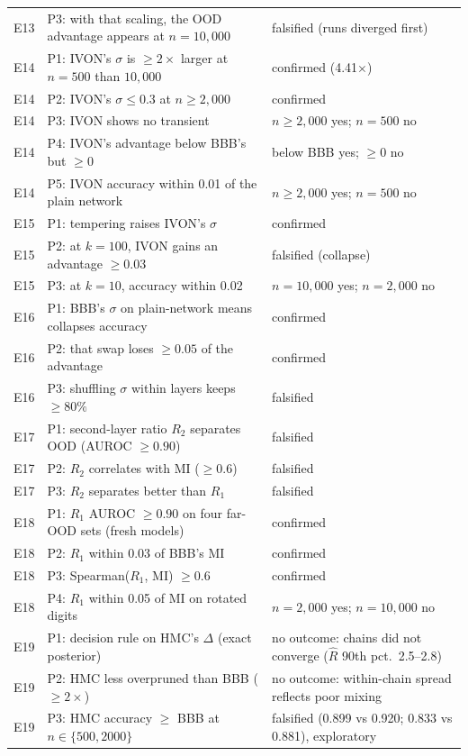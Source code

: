 \documentclass[10pt]{article}
\begin{document}
{\begin{longtable}{p{0.9cm}p{8.6cm}p{4.6cm}}
E13 & P3: with that scaling, the OOD advantage appears at $n=10{,}000$ & falsified (runs diverged first) \\
E14 & P1: IVON's $\sigma$ is $\ge2\times$ larger at $n=500$ than $10{,}000$ & confirmed (4.41$\times$) \\
E14 & P2: IVON's $\sigma\le0.3$ at $n\ge2{,}000$ & confirmed \\
E14 & P3: IVON shows no transient & $n\ge2{,}000$ yes; $n=500$ no \\
E14 & P4: IVON's advantage below BBB's but $\ge0$ & below BBB yes; $\ge0$ no \\
E14 & P5: IVON accuracy within 0.01 of the plain network & $n\ge2{,}000$ yes; $n=500$ no \\
E15 & P1: tempering raises IVON's $\sigma$ & confirmed \\
E15 & P2: at $k=100$, IVON gains an advantage $\ge0.03$ & falsified (collapse) \\
E15 & P3: at $k=10$, accuracy within 0.02 & $n=10{,}000$ yes; $n=2{,}000$ no \\
E16 & P1: BBB's $\sigma$ on plain-network means collapses accuracy & confirmed \\
E16 & P2: that swap loses $\ge0.05$ of the advantage & confirmed \\
E16 & P3: shuffling $\sigma$ within layers keeps $\ge80\%$ & falsified \\
E17 & P1: second-layer ratio $R_2$ separates OOD (AUROC $\ge0.90$) & falsified \\
E17 & P2: $R_2$ correlates with MI ($\ge0.6$) & falsified \\
E17 & P3: $R_2$ separates better than $R_1$ & falsified \\
E18 & P1: $R_1$ AUROC $\ge0.90$ on four far-OOD sets (fresh models) & confirmed \\
E18 & P2: $R_1$ within 0.03 of BBB's MI & confirmed \\
E18 & P3: Spearman($R_1$, MI) $\ge0.6$ & confirmed \\
E18 & P4: $R_1$ within 0.05 of MI on rotated digits & $n=2{,}000$ yes; $n=10{,}000$ no \\
E19 & P1: decision rule on HMC's $\Delta$ (exact posterior) & no outcome: chains did not converge ($\hat R$ 90th pct.\ 2.5--2.8) \\
E19 & P2: HMC less overpruned than BBB ($\ge2\times$) & no outcome: within-chain spread reflects poor mixing \\
E19 & P3: HMC accuracy $\ge$ BBB at $n\in\{500,2000\}$ & falsified (0.899 vs 0.920; 0.833 vs 0.881), exploratory \\

\end{longtable}}
\end{document}
